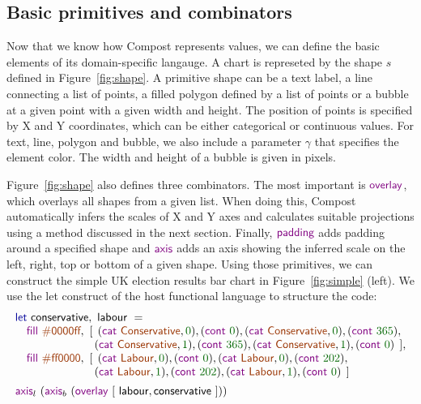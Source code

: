 \documentclass{jfp}
\newcommand{\num}[1]{\textcolor{numclr}{#1}}
\newcommand{\strf}[1]{\textnormal{\textcolor{strclr}{\sffamily #1}}}
\newcommand{\ident}[1]{\textnormal{\textcolor{idclr}{\sffamily #1}}}
\newcommand{\kvd}[1]{\textnormal{\textcolor{kvdclr}{\sffamily #1}}}
\newcommand{\fkvd}[1]{\textnormal{\textcolor{fkvdclr}{\sffamily #1}}}
\begin{document}
\subsection{Basic primitives and combinators}

Now that we know how Compost represents values, we can define the basic elements of its
domain-specific langauge. A chart is represeted by the shape $s$ defined in Figure~\ref{fig:shape}.
A primitive shape can be a text label, a line connecting a list of points, a filled polygon
defined by a list of points or a bubble at a given point with a given width and height.
The position of points is specified by X and Y coordinates, which can be either categorical or
continuous values. For text, line, polygon and bubble, we also include a parameter $\gamma$
that specifies the element color. The width and height of a bubble is given in pixels.

Figure~\ref{fig:shape} also defines three combinators. The most important is $\kvd{overlay}$,
which overlays all shapes from a given list. When doing this, Compost automatically infers the
scales of X and Y axes and calculates suitable projections using a method discussed in the next
section. Finally, $\kvd{padding}$ adds padding around a specified shape and $\kvd{axis}$ adds
an axis showing the inferred scale on the left, right, top or bottom of a given shape.
Using those primitives, we can construct the simple UK election results bar chart in Figure~\ref{fig:simple} (left).
We use the \fkvd{let} construct of the host functional language to structure the code:
%
\begin{equation*}
\begin{array}{l}
\fkvd{let}~\ident{conservative},~\ident{labour}~=\\
\quad \kvd{fill}~\strf{\#0000ff},
 ~[\;\,(\kvd{cat}~\strf{Conservative}, \num{0}), (\kvd{cont}~\num{0}), (\kvd{cat}~\strf{Conservative}, \num{0}), (\kvd{cont}~\num{365}),\\
\hspace{6.7em}\;(\kvd{cat}~\strf{Conservative}, \num{1}), (\kvd{cont}~\num{365}), (\kvd{cat}~\strf{Conservative}, \num{1}), (\kvd{cont}~\num{0})\;\,],\\
\quad \kvd{fill}~\strf{\#ff0000},
 ~[\;\,(\kvd{cat}~\strf{Labour}, \num{0}), (\kvd{cont}~\num{0}), (\kvd{cat}~\strf{Labour}, \num{0}), (\kvd{cont}~\num{202}),\\
\hspace{6.7em}\;(\kvd{cat}~\strf{Labour}, \num{1}), (\kvd{cont}~\num{202}), (\kvd{cat}~\strf{Labour}, \num{1}), (\kvd{cont}~\num{0})\,\;]\\[0.5em]
\kvd{axis}_l~(\kvd{axis}_b~(\kvd{overlay}~[~\ident{labour}, \ident{conservative}~]))\\
\end{array}
\end{equation*}
\end{document}
